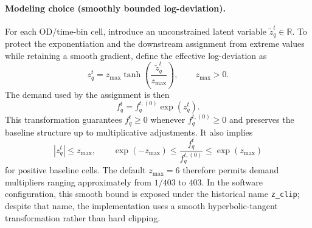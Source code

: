 \paragraph{Modeling choice (smoothly bounded log-deviation).}
For each OD/time-bin cell, introduce an unconstrained latent variable
$\widetilde{z}_q^t\in\mathbb{R}$. To protect the exponentiation and the downstream
assignment from extreme values while retaining a smooth gradient, define the effective
log-deviation as
\[
z_q^t
=
z_{\max}\tanh\!\left(\frac{\widetilde{z}_q^t}{z_{\max}}\right),
\qquad z_{\max}>0.
\]
The demand used by the assignment is then
\[
f_q^t
=
f_{q}^{t,(0)}\exp(z_q^t).
\]
This transformation guarantees $f_q^t\ge 0$ whenever $f_{q}^{t,(0)}\ge 0$ and preserves the baseline
structure up to multiplicative adjustments. It also implies
\[
|z_q^t|\le z_{\max},
\qquad
\exp(-z_{\max})
\le \frac{f_q^t}{f_q^{t,(0)}}
\le \exp(z_{\max})
\]
for positive baseline cells. The default $z_{\max}=6$ therefore permits demand
multipliers ranging approximately from $1/403$ to $403$. In the software configuration,
this smooth bound is exposed under the historical name \texttt{z\_clip}; despite that
name, the implementation uses a smooth hyperbolic-tangent transformation rather than
hard clipping.

